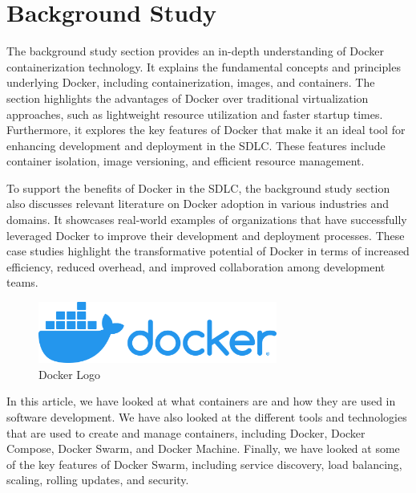 \section{Background Study}

The background study section provides an in-depth understanding of Docker containerization technology. It explains the fundamental concepts and principles underlying Docker, including containerization, images, and containers. The section highlights the advantages of Docker over traditional virtualization approaches, such as lightweight resource utilization and faster startup times. Furthermore, it explores the key features of Docker that make it an ideal tool for enhancing development and deployment in the SDLC. These features include container isolation, image versioning, and efficient resource management.

To support the benefits of Docker in the SDLC, the background study section also discusses relevant literature on Docker adoption in various industries and domains. It showcases real-world examples of organizations that have successfully leveraged Docker to improve their development and deployment processes. These case studies highlight the transformative potential of Docker in terms of increased efficiency, reduced overhead, and improved collaboration among development teams.

\begin{figure}[h]
    \centering
    \includegraphics[width=0.7\textwidth]{./resources/images/horizontal-logo-monochromatic-white.png}
    \caption{Docker Logo}
    \label{fig:docker-logo}
\end{figure}

\clearpage

In this article, we have looked at what containers are and how they are used in software development. We have also looked at the different tools and technologies that are used to create and manage containers, including Docker, Docker Compose, Docker Swarm, and Docker Machine. Finally, we have looked at some of the key features of Docker Swarm, including service discovery, load balancing, scaling, rolling updates, and security.

